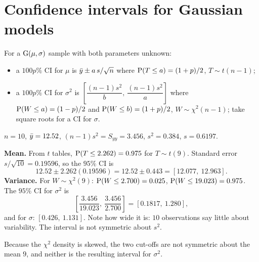 \section{Confidence intervals for Gaussian models}

\begin{theorem}
For a $\operatorname{G}(\mu,\sigma)$ sample with both parameters unknown:
\begin{itemize}
  \item a $100p\%$ CI for $\mu$ is $\bar{y}\pm a\,s/\sqrt n$ where $\operatorname{P}(T\le a) = (1+p)/2$,
        $T\sim t(n-1)$;
  \item a $100p\%$ CI for $\sigma^2$ is
        $\left[\dfrac{(n-1)s^2}{b},\ \dfrac{(n-1)s^2}{a}\right]$ where $\operatorname{P}(W\le a) =
        (1-p)/2$ and $\operatorname{P}(W\le b) = (1+p)/2$, $W\sim\chi^2(n-1)$; take square roots for
        a CI for $\sigma$.
\end{itemize}
\end{theorem}

\begin{example}
$n=10$, $\bar{y} = 12.52$, $(n-1)s^2 = S_{yy} = 3.456$, $s^2 = 0.384$, $s = 0.6197$.

\textbf{Mean.} From $t$ tables, $\operatorname{P}(T\le 2.262) = 0.975$ for $T\sim t(9)$. Standard
error $s/\sqrt{10} = 0.19596$, so the $95\%$ CI is
\[
12.52\pm 2.262(0.19596) = 12.52\pm 0.443 = [12.077,\ 12.963].
\]
\textbf{Variance.} For $W\sim\chi^2(9)$: $\operatorname{P}(W\le 2.700) = 0.025$,
$\operatorname{P}(W\le19.023) = 0.975$. The $95\%$ CI for $\sigma^2$ is
\[
\left[\frac{3.456}{19.023},\ \frac{3.456}{2.700}\right] = [0.1817,\ 1.280],
\]
and for $\sigma$: $[0.426,\ 1.131]$. Note how wide it is: $10$ observations say little
about variability. The interval is not symmetric about $s^2$.
\end{example}

\begin{center}
\end{center}
Because the $\chi^2$ density is skewed, the two cut-offs are not symmetric about the mean
$9$, and neither is the resulting interval for $\sigma^2$.

